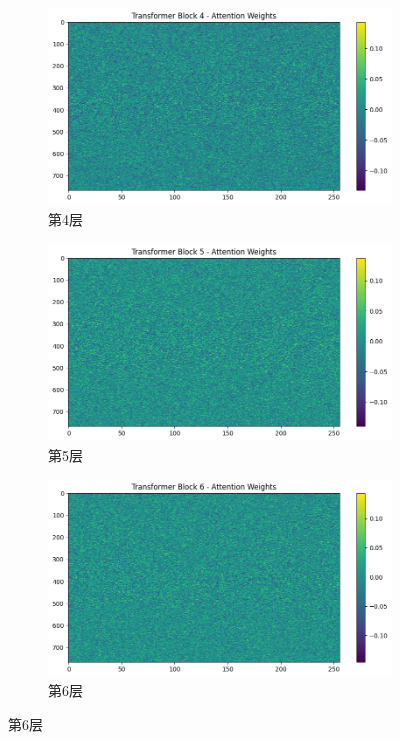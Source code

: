 \begin{figure}[H]
    \begin{subfigure}{0.3\textwidth}
        \includegraphics[width=\linewidth]{../output/transformer/with scheduler/Transformer Block 4 Attention Weights.png}
        \caption{第4层}
        \label{fig:transformerblock4attentionweightswithscheduler}
    \end{subfigure}
    \hfill
    \begin{subfigure}{0.3\textwidth}
        \includegraphics[width=\linewidth]{../output/transformer/with scheduler/Transformer Block 5 Attention Weights.png}
        \caption{第5层}
        \label{fig:transformerblock5attentionweightswithscheduler}
    \end{subfigure}
    \hfill
    \begin{subfigure}{0.3\textwidth}
        \includegraphics[width=\linewidth]{../output/transformer/with scheduler/Transformer Block 6 Attention Weights.png}
        \caption{第6层}
        \label{fig:transformerblock6attentionweightswithscheduler}
    \end{subfigure}


\end{figure}
